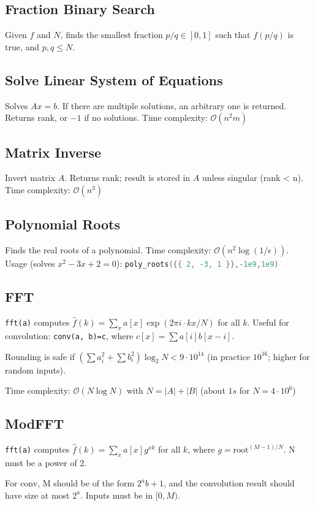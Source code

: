 \documentclass{article}
\begin{document}
\subsection*{Fraction Binary Search}
Given $f$ and $N$, finds the smallest fraction $p/q \in [0, 1]$ such that $f(p/q)$ is true, and $p, q \le N$.


\subsection*{Solve Linear System of Equations}
Solves $A x = b$. If there are multiple solutions, an arbitrary one is returned.
Returns rank, or $-1$ if no solutions. Time complexity: $\mathcal{O}(n^2 m)$


\newpage

\subsection*{Matrix Inverse}
Invert matrix $A$. Returns rank; result is stored in $A$ unless singular (rank < n). Time complexity: $\mathcal{O}(n^3)$


\subsection*{Polynomial Roots}
Finds the real roots of a polynomial. Time complexity: $\mathcal{O}(n^2 \log(1/\epsilon))$.\\
Usage (solves $x^2-3x+2 = 0$): \lstinline[language=C++]|poly_roots({{ 2, -3, 1 }},-1e9,1e9)|


\subsection*{FFT}
\lstinline{fft(a)} computes $\hat f(k) = \sum_x a[x] \exp(2\pi i \cdot k x / N)$ for all $k$.
Useful for convolution: \lstinline{conv(a, b)=c}, where $c[x] = \sum a[i]b[x-i]$.

Rounding is safe if $(\sum a_i^2 + \sum b_i^2)\log_2{N} < 9\cdot10^{14}$
(in practice $10^{16}$; higher for random inputs).

Time complexity: $\mathcal{O}(N \log N)$ with $N = |A|+|B|$ (about $1s$ for $N=4 \cdot 10^6$)


\newpage

\subsection*{ModFFT}
\lstinline{fft(a)} computes $\hat f(k) = \sum_x a[x] g^{xk}$ for all $k$, where $g=\text{root}^{(M-1)/N}$. N must be a power of 2.

For conv, M should be of the form $2^a b+1$, and the convolution result should have size at most $2^a$. Inputs must be in $[0,M)$.


\end{document}
